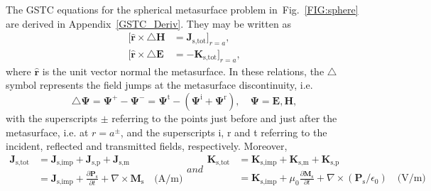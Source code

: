 \documentclass[journal,transaction]{IEEEtran}
\newcommand{\figref}{Fig.~\ref}
\newcommand{\ve}[1]{\mathbf{#1}}
\newcommand{\uve}[1]{\mathbf{\hat{#1}}}
\newcommand{\ves}[1]{\boldsymbol{#1}}
\begin{document}
The GSTC equations for the spherical metasurface problem in~\figref{FIG:sphere} are derived in Appendix~\ref{GSTC_Deriv}. They may be written as
%
\begin{subequations}\label{Eq:BC}
\begin{align}
[\uve{r}\times\triangle\ve{H}&=\ve{J}_\text{s,tot}]_{r=a},\\
[\uve{r}\times\triangle\ve{E}&=-\ve{K}_\text{s,tot}]_{r=a},
\end{align}
\end{subequations}
%
where $\uve{r}$ is the unit vector normal the metasurface.
%
In these relations, the $\triangle$ symbol represents the field jumps at the metasurface discontinuity, i.e.
%
\begin{equation}\label{Eq:diff_fields}
\triangle\ves{\Psi}
=\ves{\Psi}^+-\ves{\Psi}^-
=\ves{\Psi}^\text{t}-(\ves{\Psi}^\text{i}+\ves{\Psi}^\text{r}),
\quad
\ves{\Psi}=\ve{E},\ve{H},
\end{equation}
%
with the superscripts $\pm$ referring to the points just before and just after the metasurface, i.e. at $r=a^\pm$, and the superscripts i, r and t referring to the incident, reflected and transmitted fields, respectively. Moreover,
%
\begin{subequations}\label{Eq:JKtotal}
\begin{align}\label{Eq:Jtotal}
\ve{J}_\text{s,tot}
&=\ve{J}_\text{s,imp}+\ve{J}_\text{s,p}+\ve{J}_\text{s,m}\\
&=\ve{J}_\text{s,imp}+\frac{\partial \ve{P}_\text{s}}{\partial t}+\nabla\times\ve{M}_\text{s}
\quad\text{(A/m)}
\end{align}
and
\begin{align}\label{Eq:Ktotal}
\ve{K}_\text{s,tot}
&=\ve{K}_\text{s,imp}+\ve{K}_\text{s,m}+\ve{K}_\text{s,p}\\
&=\ve{K}_\text{s,imp}+\mu_0 \frac{\partial \ve{M}_\text{s}}{\partial t}+\nabla \times(\ve{P}_\text{s}/\epsilon_0)
\quad\text{(V/m)}
\end{align}
\end{subequations}
%
\end{document}

